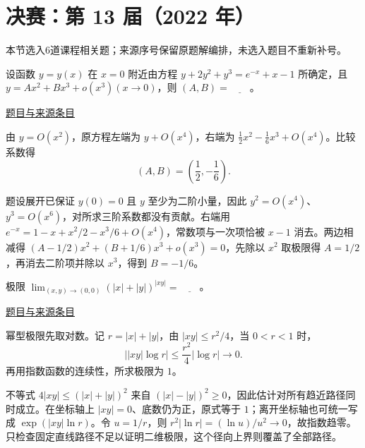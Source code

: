 \documentclass[UTF8,12pt,a4paper,fontset=fandol]{ctexart}
\begin{document}
\section{决赛：第 13 届（2022 年）}

本节选入6道课程相关题；来源序号保留原题解编排，未选入题目不重新补号。

\begin{example}[来源序号1]\label{ex:fin13-high:1}\label{pr:fin13-high:1}

设函数 $y = y(x)$ 在 $x = 0$ 附近由方程 $y + 2y^2 + y^3 = e^{-x} + x - 1$ 所确定，且 $y = Ax^2 + Bx^3 + o\left(x^3\right)(x \rightarrow 0)$，则 $(A,B) = \underline{\qquad}$。

\par\href{https://github.com/lzxcr/cmc-mathematics/blob/64916fa1fdbc3e444a652eca204d5669058ee321/src/problems/finals/13/01.md}{题目与来源条目}

\end{example}

\begin{solve}\label{ans:fin13-high:1}

由 $y=O(x^2)$，原方程左端为 $y+O(x^4)$，右端为 $\frac12x^2-\frac16x^3+O(x^4)$。比较系数得
\[
(A,B)=\boxed{\left(\frac12,-\frac16\right)}.
\]

题设展开已保证 $y(0)=0$ 且 $y$ 至少为二阶小量，因此 $y^2=O(x^4)$、$y^3=O(x^6)$，对所求三阶系数都没有贡献。右端用 $e^{-x}=1-x+x^2/2-x^3/6+O(x^4)$，常数项与一次项恰被 $x-1$ 消去。两边相减得 $(A-1/2)x^2+(B+1/6)x^3+o(x^3)=0$，先除以 $x^2$ 取极限得 $A=1/2$，再消去二阶项并除以 $x^3$，得到 $B=-1/6$。

\end{solve}

\begin{example}[来源序号2]\label{ex:fin13-high:2}\label{pr:fin13-high:2}

极限 $\lim_{(x,y) \rightarrow (0,0)} \left( |x| + |y| \right)^{|xy|} = \underline{\qquad}$。

\par\href{https://github.com/lzxcr/cmc-mathematics/blob/64916fa1fdbc3e444a652eca204d5669058ee321/src/problems/finals/13/02.md}{题目与来源条目}

\end{example}

\begin{solve}\label{ans:fin13-high:2}

幂型极限先取对数。记 $r=|x|+|y|$，由 $|xy|\le r^2/4$，当 $0<r<1$ 时，
\[
\bigl||xy|\log r\bigr|\le\frac{r^2}{4}|\log r|\longrightarrow0.
\]
再用指数函数的连续性，所求极限为 $\boxed1$。

不等式 $4|xy|\le(|x|+|y|)^2$ 来自 $(|x|-|y|)^2\ge0$，因此估计对所有趋近路径同时成立。在坐标轴上 $|xy|=0$、底数仍为正，原式等于 $1$；离开坐标轴也可统一写成 $\exp(|xy|\ln r)$。令 $u=1/r$，则 $r^2|\ln r|=(\ln u)/u^2\to0$，故指数趋零。只检查固定直线路径不足以证明二维极限，这个径向上界则覆盖了全部路径。

\end{solve}
\end{document}
